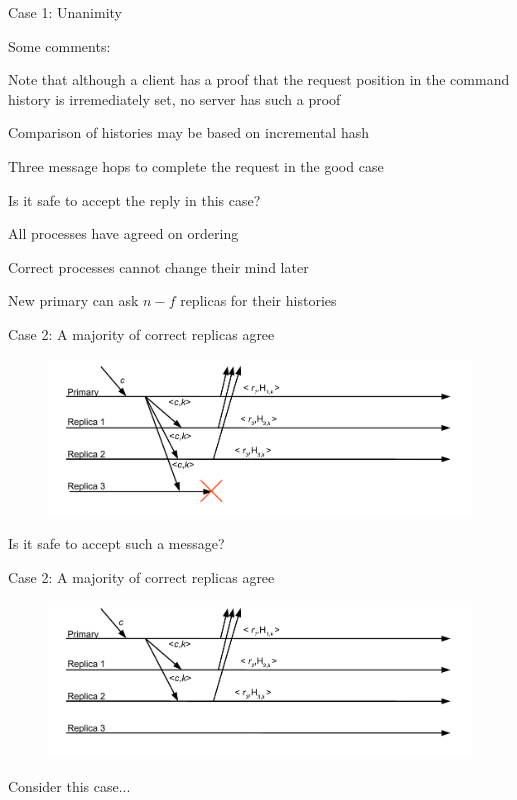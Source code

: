 \begin{frame}{Case 1: Unanimity}
	
Some comments:
\BI
\item Note that although a client has a proof that the request position
in the command history is irremediately set, no server has such a proof
\item Comparison of histories may be based on incremental hash
\item Three message hops to complete the request in the good case
\EI

\bigskip
Is it safe to accept the reply in this case?
\BI
\pause
\item All processes have agreed on ordering
\pause
\item Correct processes cannot change their mind later
\pause
\item New primary can ask $n-f$ replicas for their histories
\EI

\end{frame}

\begin{frame}{Case 2: A majority of correct replicas agree}

\begin{figure}
	\includegraphics[width=\textwidth]{messages7}	
\end{figure}

Is it safe to accept such a message?

\end{frame}

\begin{frame}{Case 2: A majority of correct replicas agree}

\begin{figure}
	\includegraphics[width=\textwidth]{messages8}	
\end{figure}

Consider this case...

\end{frame}

